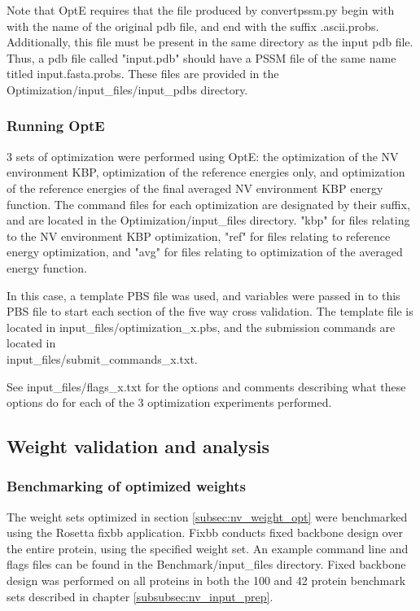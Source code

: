 Note that OptE requires that the file produced by convertpssm.py begin with with the name of the original pdb file, and end with the suffix .ascii.probs.
Additionally, this file must be present in the same directory as the input pdb file.
Thus, a pdb file called "input.pdb" should have a PSSM file of the same name titled input.fasta.probs.
These files are provided in the Optimization/input\_files/input\_pdbs directory.

\subsubsection{Running OptE}
3 sets of optimization were performed using OptE: the optimization of the NV environment KBP, optimization of the reference energies only, and optimization of the reference energies of the final averaged NV environment KBP energy function.
The command files for each optimization are designated by their suffix, and are located in the Optimization/input\_files directory.
"kbp" for files relating to the NV environment KBP optimization, "ref" for files relating to reference energy optimization, and "avg" for files relating to optimization of the averaged energy function.  

In this case, a template PBS file was used, and variables were passed in to this PBS file to start each section of the five way cross validation.
The template file is located in input\_files/optimization\_x.pbs, and the submission commands are located in\\
input\_files/submit\_commands\_x.txt.

See input\_files/flags\_x.txt for the options and comments describing what these options do for each of the 3 optimization experiments performed. 

\subsection{Weight validation and analysis}

\subsubsection{Benchmarking of optimized weights}

The weight sets optimized in section \ref{subsec:nv_weight_opt} were benchmarked using the Rosetta fixbb application.
Fixbb conducts fixed backbone design over the entire protein, using the specified weight set. 
An example command line and flags files can be found in the Benchmark/input\_files directory.
Fixed backbone design was performed on all proteins in both the 100 and 42 protein benchmark sets described in chapter \ref{subsubsec:nv_input_prep}.

